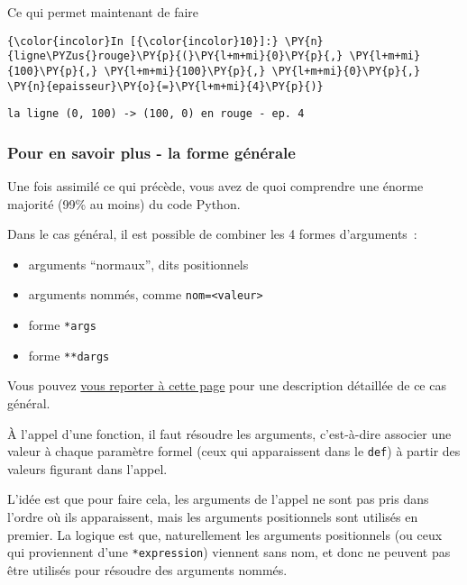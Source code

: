     Ce qui permet maintenant de faire

    \begin{Verbatim}[commandchars=\\\{\},frame=single,framerule=0.3mm,rulecolor=\color{cellframecolor}]
{\color{incolor}In [{\color{incolor}10}]:} \PY{n}{ligne\PYZus{}rouge}\PY{p}{(}\PY{l+m+mi}{0}\PY{p}{,} \PY{l+m+mi}{100}\PY{p}{,} \PY{l+m+mi}{100}\PY{p}{,} \PY{l+m+mi}{0}\PY{p}{,} \PY{n}{epaisseur}\PY{o}{=}\PY{l+m+mi}{4}\PY{p}{)}
\end{Verbatim}


    \begin{Verbatim}[commandchars=\\\{\},frame=single,framerule=0.3mm,rulecolor=\color{cellframecolor}]
la ligne (0, 100) -> (100, 0) en rouge - ep. 4
\end{Verbatim}

    \hypertarget{pour-en-savoir-plus---la-forme-guxe9nuxe9rale}{%
\subsubsection{Pour en savoir plus - la forme
générale}\label{pour-en-savoir-plus---la-forme-guxe9nuxe9rale}}

    Une fois assimilé ce qui précède, vous avez de quoi comprendre une
énorme majorité (99\% au moins) du code Python.

Dans le cas général, il est possible de combiner les 4 formes
d'arguments~:

\begin{itemize}
\tightlist
\item
  arguments ``normaux'', dits positionnels
\item
  arguments nommés, comme \texttt{nom=\textless{}valeur\textgreater{}}
\item
  forme \texttt{*args}
\item
  forme \texttt{**dargs}
\end{itemize}

Vous pouvez
\href{https://docs.python.org/3/reference/expressions.html\#calls}{vous
reporter à cette page} pour une description détaillée de ce cas général.

    À l'appel d'une fonction, il faut résoudre les arguments, c'est-à-dire
associer une valeur à chaque paramètre formel (ceux qui apparaissent
dans le \texttt{def}) à partir des valeurs figurant dans l'appel.

L'idée est que pour faire cela, les arguments de l'appel ne sont pas
pris dans l'ordre où ils apparaissent, mais les arguments positionnels
sont utilisés en premier. La logique est que, naturellement les
arguments positionnels (ou ceux qui proviennent d'une
\texttt{*expression}) viennent sans nom, et donc ne peuvent pas être
utilisés pour résoudre des arguments nommés.

